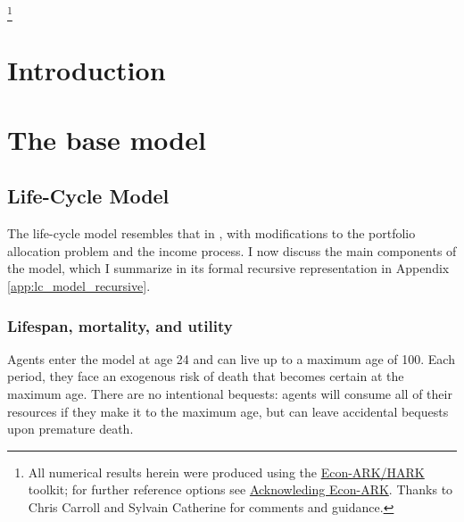 \documentclass[./RiskyContrib.tex]{subfiles}
\begin{document}
\begin{authorsinfo}
\end{authorsinfo}

\thanks{All numerical results herein were produced using the \href{https://econ-ark/HARK}{Econ-ARK/HARK} toolkit; for further reference options see \href{https://econ-ark.org/acknowledging/}{Acknowleding Econ-ARK}.  Thanks to Chris Carroll and Sylvain Catherine for comments and guidance.}

\titlepagefinish

\newtheorem{defn}{Definition}
\newtheorem{theorem}{Theorem}

\hypertarget{Introduction}{}
\section{Introduction}

\hypertarget{The-base-model}{}
\section{The base model}

\subsection{Life-Cycle Model}\label{sec:mod_lc}

The life-cycle model resembles that in \cite{Cocco2005rfs}, with modifications
to the portfolio allocation problem and the income process. I now discuss the main
components of the model, which I summarize in its formal recursive representation
in Appendix \ref{app:lc_model_recursive}.

\subsubsection{Lifespan, mortality, and utility}

Agents enter the model at age 24 and can live up to a maximum age of 100.
Each  period, they face an exogenous risk of death that becomes certain at the 
maximum age. There are no intentional bequests: agents will consume all of their 
resources if they make it to the maximum age, but can leave accidental 
bequests upon premature death.
\end{document}
